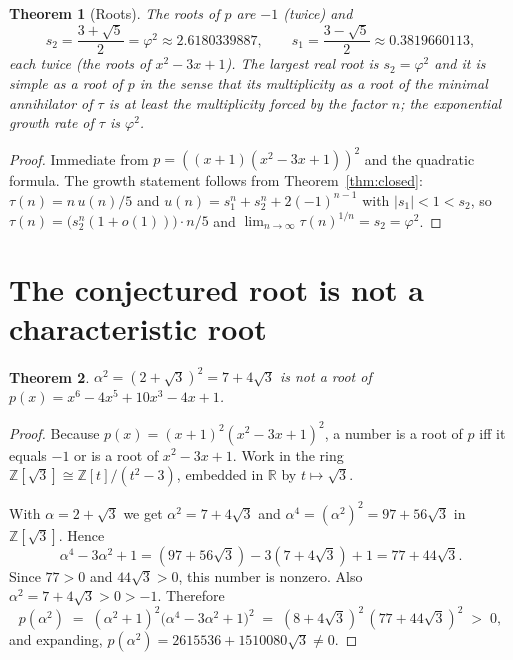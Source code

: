 \documentclass[11pt]{article}
\newtheorem{theorem}{Theorem}
\theoremstyle{definition}
\theoremstyle{remark}
\newcommand{\Z}{\mathbb{Z}}
\newcommand{\R}{\mathbb{R}}
\newcommand{\tauc}{\tau}
\begin{document}
\begin{theorem}[Roots]
\label{thm:roots}
The roots of $p$ are $-1$ (twice) and
\[
s_2 = \frac{3+\sqrt5}{2} = \varphi^{2} \approx 2.6180339887,
\qquad
s_1 = \frac{3-\sqrt5}{2} \approx 0.3819660113,
\]
each twice (the roots of $x^{2}-3x+1$). The largest real root is $s_2 = \varphi^{2}$
and it is simple as a root of $p$ in the sense that its multiplicity as a root
of the minimal annihilator of $\tauc$ is at least the multiplicity forced by the
factor $n$; the exponential growth rate of $\tauc$ is $\varphi^{2}$.
\end{theorem}

\begin{proof}
Immediate from $p = ((x+1)(x^{2}-3x+1))^{2}$ and the quadratic formula. The
growth statement follows from Theorem~\ref{thm:closed}: $\tauc(n) = n\,u(n)/5$
and $u(n) = s_1^{n} + s_2^{n} + 2(-1)^{n-1}$ with $|s_1| < 1 < s_2$, so
$\tauc(n) = \bigl(s_2^{n}(1+o(1))\bigr)\cdot n/5$ and
$\lim_{n\to\infty} \tauc(n)^{1/n} = s_2 = \varphi^{2}$.
\end{proof}

\section{The conjectured root is not a characteristic root}
\label{sec:root}

\begin{theorem}
\label{thm:notroot}
$\alpha^{2} = (2+\sqrt3)^{2} = 7+4\sqrt3$ is not a root of
$p(x) = x^{6}-4x^{5}+10x^{3}-4x+1$.
\end{theorem}

\begin{proof}
Because $p(x) = (x+1)^{2}(x^{2}-3x+1)^{2}$, a number is a root of $p$ iff it
equals $-1$ or is a root of $x^{2}-3x+1$. Work in the ring
$\Z[\sqrt3] \cong \Z[t]/(t^{2}-3)$, embedded in $\R$ by $t \mapsto \sqrt3$.

With $\alpha = 2+\sqrt3$ we get $\alpha^{2} = 7+4\sqrt3$ and
$\alpha^{4} = (\alpha^{2})^{2} = 97 + 56\sqrt3$ in $\Z[\sqrt3]$. Hence
\[
\alpha^{4} - 3\alpha^{2} + 1
= (97+56\sqrt3) - 3(7+4\sqrt3) + 1
= 77 + 44\sqrt3 .
\]
Since $77 > 0$ and $44\sqrt3 > 0$, this number is nonzero. Also
$\alpha^{2} = 7+4\sqrt3 > 0 > -1$. Therefore
\[
p(\alpha^{2}) \;=\; (\alpha^{2}+1)^{2}\bigl(\alpha^{4}-3\alpha^{2}+1\bigr)^{2}
\;=\; (8+4\sqrt3)^{2}\,(77+44\sqrt3)^{2} \;>\; 0 ,
\]
and expanding, $p(\alpha^{2}) = 2615536 + 1510080\sqrt3 \neq 0$.
\end{proof}
\end{document}
